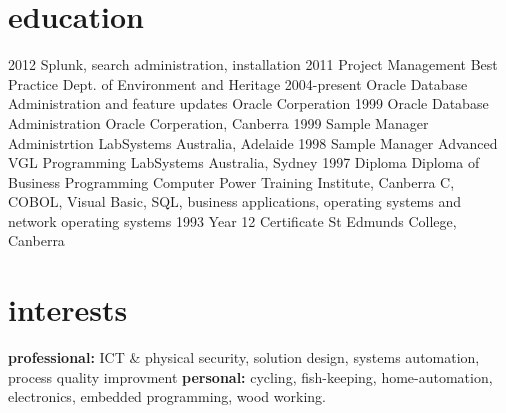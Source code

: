 \documentclass[]{friggeri-cv} %
\begin{document}
\section{education}
\begin{entrylist}
\entry
{2012}
{Splunk, search administration, installation}
{ }
{ }
\entry
{2011}
{Project Management Best Practice}
{Dept. of Environment and Heritage}
{ }
\entry
{2004-present}
{Oracle {\normalfont Database Administration and feature updates}}
{Oracle Corperation}
{ }
\entry
{1999}
{Oracle {\normalfont Database Administration}}
{Oracle Corperation, Canberra}
{ }
\entry
{1999}
{Sample Manager {\normalfont Administrtion}}
{LabSystems Australia, Adelaide}
{ }
\entry
{1998}
{Sample Manager {\normalfont Advanced VGL Programming}}
{LabSystems Australia, Sydney}
{ }
\entry
{1997}
{Diploma {\normalfont Diploma of Business Programming}}
{Computer Power Training Institute, Canberra}
{C, COBOL, Visual Basic, SQL, business applications, operating systems and network operating systems}
\entry
{1993}
{Year 12 Certificate}
{St Edmunds College, Canberra}
{ }
\end{entrylist}



\section{interests}

\textbf{professional:} ICT \& physical security, solution design, systems automation, process quality improvment \textbf{personal:} cycling, fish-keeping, home-automation, electronics, embedded programming, wood working.

\end{document}
